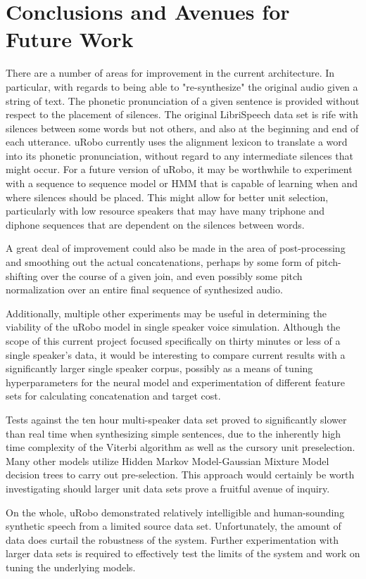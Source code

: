 \documentclass[10pt, journal, compsoc]{IEEEtran}
\begin{document}
\section{Conclusions and Avenues for Future Work}
There are a number of areas for improvement in the current architecture. In particular, with regards to being able to "re-synthesize" the original audio given a string of text. The phonetic pronunciation of a given sentence is provided without respect to the placement of silences. The original LibriSpeech data set is rife with silences between some words but not others, and also at the beginning and end of each utterance. uRobo currently uses the alignment lexicon to translate a word into its phonetic pronunciation, without regard to any intermediate silences that might occur. For a future version of uRobo, it may be worthwhile to experiment with a sequence to sequence model or HMM that is capable of learning when and where silences should be placed. This might allow for better unit selection, particularly with low resource speakers that may have many triphone and diphone sequences that are dependent on the silences between words. \par
A great deal of improvement could also be made in the area of post-processing and smoothing out the actual concatenations, perhaps by some form of pitch-shifting over the course of a given join, and even possibly some pitch normalization over an entire final sequence of synthesized audio.\par
Additionally, multiple other experiments may be useful in determining the viability of the uRobo model in single speaker voice simulation. Although the scope of this current project focused specifically on thirty minutes or less of a single speaker's data, it would be interesting to compare current results with a significantly larger single speaker corpus, possibly as a means of tuning hyperparameters for the neural model and experimentation of different feature sets for calculating concatenation and target cost.\par
Tests against the ten hour multi-speaker data set proved to significantly slower than real time when synthesizing simple sentences, due to the inherently high time complexity of the Viterbi algorithm as well as the cursory unit preselection. Many other models utilize Hidden Markov Model-Gaussian Mixture Model decision trees to carry out pre-selection.\cite{45564} This approach would certainly be worth investigating should larger unit data sets prove a fruitful avenue of inquiry.\par
On the whole, uRobo demonstrated relatively intelligible and human-sounding synthetic speech from a limited source data set. Unfortunately, the amount of data does curtail the robustness of the system. Further experimentation with larger data sets is required to effectively test the limits of the system and work on tuning the underlying models. 

\end{document}
